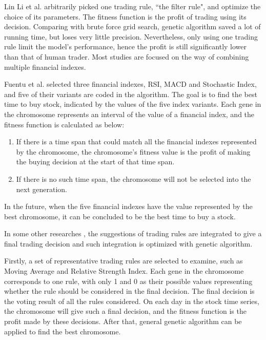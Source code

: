 \documentclass{article}
\begin{document}
Lin Li et al. \cite{the-applications-of-genetic-algorithms-in-stock-market-data-mining}
arbitrarily picked one trading rule, ``the filter rule", and optimize the choice of its parameters.
The fitness function is the profit of trading using its decision.
Comparing with brute force grid search, genetic algorithm saved a lot of running time,
but loses very little precision.
Nevertheless, only using one trading rule limit the model's performance, hence
the profit is still significantly lower than that of human trader.
Most studies are focused on the way of combining multiple financial indexes.

Fuentu et al. \cite{genetic-algorithms-to-optimise-the-time-to-make-stock-market-investment} selected
three financial indexes, RSI, MACD and Stochastic Index,
and five of their variants are coded in the algorithm.
The goal is to find the best time to buy stock, indicated by the values of the five index variants.
Each gene in the chromosome represents an interval of the value of a financial index,
and the fitness function is calculated as below:
\begin{enumerate}
\item If there is a time span that could match all the financial indexes represented by the chromosome,
	the chromosome's fitness value is the profit of making the buying decision at the start of that time span.
\item If there is no such time span, the chromosome will not be selected into the next generation.
\end{enumerate}
In the future, when the five financial indexes have the value represented by the best chromosome,
it can be concluded to be the best time to buy a stock.


In some other researches
\cite{genetic-algorithms-for-predicting-the-egyptian-stock-market}
\cite{stock-timing-using-genetic-algorithms}
, the suggestions of trading rules are integrated to give a final trading decision
and such integration is optimized with genetic algorithm.

Firstly, a set of representative trading rules are selected to examine,
such as Moving Average and Relative Strength Index.
Each gene in the chromosome corresponds to one rule,
with only 1 and 0 as their possible values
representing whether the rule should be considered in the final decision.
The final decision is the voting result of all the rules considered.
On each day in the stock time series, the chromosome will give such a final decision,
and the fitness function is the profit made by these decisions.
After that, general genetic algorithm can be applied to find the best chromosome.
\end{document}
